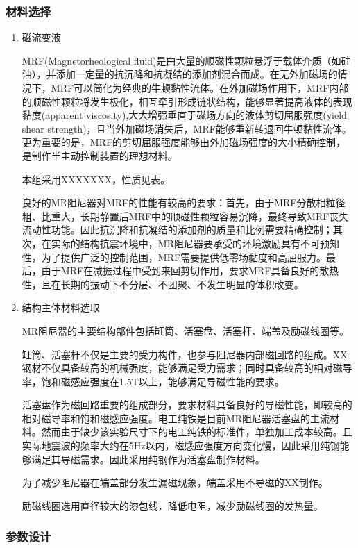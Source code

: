 \subsubsection{材料选择}
\begin{enumerate}
\item 磁流变液

MRF(Magnetorheological fluid)是由大量的顺磁性颗粒悬浮于载体介质（如硅油），并添加一定量的抗沉降和抗凝结的添加剂混合而成。在无外加磁场的情况下，MRF可以简化为经典的牛顿黏性流体。在外加磁场作用下，MRF内部的顺磁性颗粒将发生极化，相互牵引形成链状结构，能够显著提高液体的表现黏度(apparent viscosity),大大增强垂直于磁场方向的液体剪切屈服强度(yield shear strength)，且当外加磁场消失后，MRF能够重新转退回牛顿黏性流体。更为重要的是，MRF的剪切屈服强度能够由外加磁场强度的大小精确控制，是制作半主动控制装置的理想材料。

本组采用XXXXXXX，性质见表。

良好的MR阻尼器对MRF的性能有较高的要求：首先，由于MRF分散相粒径粗、比重大，长期静置后MRF中的顺磁性颗粒容易沉降，最终导致MRF丧失流动性功能。因此抗沉降和抗凝结的添加剂的质量和比例需要精确控制；其次，在实际的结构抗震环境中，MR阻尼器要承受的环境激励具有不可预知性，为了提供广泛的控制范围，MRF需要提供低零场黏度和高屈服力。最后，由于MRF在减振过程中受到来回剪切作用，要求MRF具备良好的散热性，且在长期的振动下不分层、不团聚、不发生明显的体积改变。

\item 结构主体材料选取

MR阻尼器的主要结构部件包括缸筒、活塞盘、活塞杆、端盖及励磁线圈等。

缸筒、活塞杆不仅是主要的受力构件，也参与阻尼器内部磁回路的组成。XX钢材不仅具备较高的机械强度，能够满足受力需求；同时具备较高的相对磁导率，饱和磁感应强度在1.5T以上，能够满足导磁性能的要求。

活塞盘作为磁回路重要的组成部分，要求材料具备良好的导磁性能，即较高的相对磁导率和饱和磁感应强度。电工纯铁是目前MR阻尼器活塞盘的主流材料。然而由于缺少该实验尺寸下的电工纯铁的标准件，单独加工成本较高。且实际地震波的频率大约在5Hz以内，磁感应强度方向变化慢，因此采用纯钢能够满足其导磁需求。因此采用纯钢作为活塞盘制作材料。

为了减少阻尼器在端盖部分发生漏磁现象，端盖采用不导磁的XX制作。

励磁线圈选用直径较大的漆包线，降低电阻，减少励磁线圈的发热量。

\end{enumerate}

\subsubsection{参数设计}

